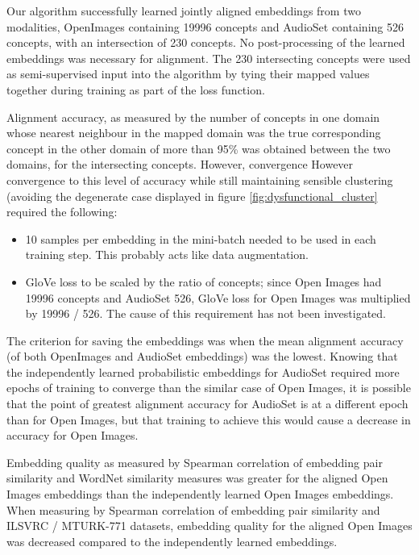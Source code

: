 Our algorithm successfully learned jointly aligned embeddings from two modalities, OpenImages containing 19996 concepts and AudioSet containing 526 concepts, with an intersection of 230 concepts. No post-processing of the learned embeddings was necessary for alignment. The 230 intersecting concepts were used as semi-supervised input into the algorithm by tying their mapped values together during training as part of the loss function. 

Alignment accuracy, as measured by the number of concepts in one domain whose nearest neighbour in the mapped domain was the true corresponding concept in the other domain  of more than 95\% was obtained between the two domains, for the intersecting concepts. However, convergence However convergence to this level of accuracy while still maintaining sensible clustering (avoiding the degenerate case displayed in figure \ref{fig:dysfunctional_cluster} required the following:

    \begin{itemize}
        \item 10 samples per embedding in the mini-batch needed to be used in each training step. This probably acts like data augmentation. 
        \item GloVe loss to be scaled by the ratio of concepts; since Open Images had 19996 concepts and AudioSet 526, GloVe loss for Open Images was multiplied by 19996 / 526. The cause of this requirement has not been investigated. 
    \end{itemize}
    
The criterion for saving the embeddings was when the mean alignment accuracy (of both OpenImages and AudioSet embeddings) was the lowest. Knowing that the independently learned probabilistic embeddings for AudioSet required more epochs of training to converge than the similar case of Open Images, it is possible that the point of greatest alignment accuracy for AudioSet is at a different epoch than for Open Images, but that training to achieve this would cause a decrease in accuracy for Open Images. 

    
Embedding quality as measured by Spearman correlation of embedding pair similarity and WordNet similarity measures was greater for the aligned Open Images embeddings than the independently learned Open Images embeddings. When measuring by Spearman correlation of embedding pair similarity and ILSVRC / MTURK-771 datasets, embedding quality for the aligned Open Images was decreased compared to the independently learned embeddings.     

